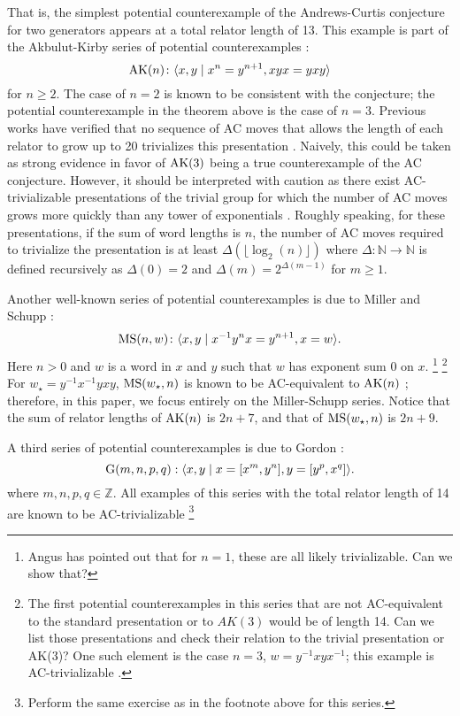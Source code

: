 That is, the simplest potential counterexample of the Andrews-Curtis conjecture for two generators
appears at a total relator length of 13.
This example is part of the Akbulut-Kirby series of potential counterexamples \cite{Akbulut-Kirby}:
\[
\text{AK}(n) \colon \langle x, y \mid x^n = y^{n+1}, xyx = yxy\rangle
\]
for $n \geq 2.$ The case of $n=2$ is known to be consistent with the conjecture; the potential counterexample
in the theorem above is the case of $n=3$.
Previous works have verified that no sequence of AC moves that allows the length of each relator to grow up to 20 trivializes this presentation \cite{Panteleev-Ushakov}.
Naively, this could be taken as strong evidence in favor of $\text{AK}(3)$ being a true counterexample of the AC conjecture.
However, it should be interpreted with caution as there exist AC-trivializable presentations of the trivial group for which the number of AC moves grows more quickly than any tower of exponentials \cite{Bridson, Lishak}.
Roughly speaking, for these presentations, if the sum of word lengths is $n$, the number of AC moves required to trivialize the presentation is at least $\Delta (\lfloor \log_2 (n) \rfloor)$ where $\Delta \colon \mathbb{N} \to \mathbb{N}$ is defined recursively as $\Delta(0) = 2$ and $\Delta (m) = 2^{\Delta(m-1)}$ for $m \geq 1$.
\newline

Another well-known series of potential counterexamples is due to Miller and Schupp \cite{Miller-Schupp}:
\[
\text{MS}(n, w) \colon \langle x, y \mid x^{-1} y^n x = y^{n+1}, x = w\rangle.
\]
Here $n > 0$ and $w$ is a word in $x$ and $y$ such that $w$ has exponent sum 0
on $x$.
\footnote{Angus has pointed out that for $n=1$, these are all likely trivializable.
Can we show that?
	 }
\footnote{The first potential counterexamples in this series that are not AC-equivalent to the standard presentation or to $AK(3)$ would be of length 14.
Can we list those presentations and	check their relation to the trivial presentation or AK(3)? One such element is the case $n=3$, $w = y^{-1} x y x^{-1}$; this example is AC-trivializable \cite{morse}.}
For $w_\star = y^{-1} x^{-1} y x y$, $\text{MS}(w_\star, n)$ is known to be AC-equivalent to $\text{AK}(n)$ \cite{MMS}; therefore, in this paper, we focus entirely on the Miller-Schupp series.
Notice that the sum of relator lengths of $\text{AK}(n)$ is $2n+7$, and that of $\text{MS}(w_\star, n)$ is $2n+9$.
\newline

A third series of potential counterexamples is due to Gordon \cite{Brown}:
\[
\text{G}(m, n, p, q): \langle x, y \mid x = [x^m, y^n], y = [y^p, x^q]\rangle.
\]
where $m,n,p,q \in \mathbb{Z}$.
All examples of this series with the total relator length of 14 are known
to be AC-trivializable \cite{Bowman-McCaul}
\footnote{Perform the same exercise as in the footnote above for this series.}
\newline

